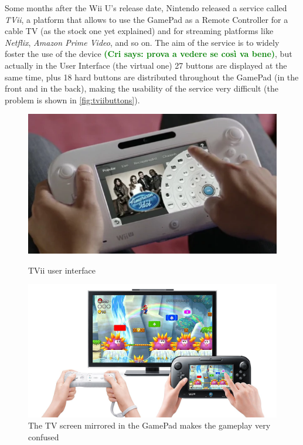 \documentclass[11pt,a4paper,titlepage]{article}
\newcommand{\cri}[1]{\textcolor{green}{\textbf{(Cri says: #1)}}}
\begin{document}
			Some months after the Wii U's release date, Nintendo released a service called \textit{TVii}, a platform that allows to use the GamePad as a Remote Controller for a cable TV (as the stock one yet explained) and for streaming platforms like \textit{Netflix}, \textit{Amazon Prime Video}, and so on.
			The aim of the service is to widely foster the use of the device \cri{prova a vedere se così va bene}, but actually in the User Interface (the virtual one) 27 buttons are displayed at the same time, plus 18 hard buttons are distributed throughout the GamePad (in the front and in the back), making the usability of the service very difficult (the problem is shown in \autoref{fig:tviibuttons}).
			\begin{figure}[htbp]
				\begin{minipage}{.5\textwidth}
					\includegraphics[width=\textwidth]{TViibuttons.png}
					\caption{TVii user interface}
					\label{fig:tviibuttons}
				\end{minipage}
				\begin{minipage}{.5\textwidth}
					\includegraphics[width=\textwidth]{mariobrosu.jpeg}
					\caption{The TV screen mirrored in the GamePad makes the gameplay very confused}
					\label{fig:mariobros_u}
				\end{minipage}
			\end{figure}
\end{document}
